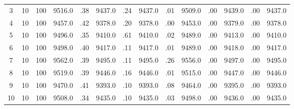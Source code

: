 \documentclass[12pt,a4paper]{article}
\begin{document}
\begin{center}
{\begin{tabular}{|ccc|cc|cc|cc|cc|cc|c|}
3             &  10& 100&   9516.0&  .38&   9437.0&  .24&   9437.0&  .01&   9509.0&  .00&   9439.0&  .00&   9437.0\\[-0.01in]
4             &  10& 100&   9457.0&  .42&   9378.0&  .20&   9378.0&  .00&   9453.0&  .00&   9379.0&  .00&   9378.0\\[-0.01in]
5             &  10& 100&   9496.0&  .35&   9410.0&  .61&   9410.0&  .02&   9489.0&  .00&   9413.0&  .00&   9410.0\\[-0.01in]
6             &  10& 100&   9498.0&  .40&   9417.0&  .11&   9417.0&  .01&   9489.0&  .00&   9418.0&  .00&   9417.0\\[-0.01in]
7             &  10& 100&   9562.0&  .39&   9495.0&  .11&   9495.0&  .26&   9556.0&  .00&   9497.0&  .00&   9495.0\\[-0.01in]
8             &  10& 100&   9519.0&  .39&   9446.0&  .16&   9446.0&  .01&   9515.0&  .00&   9447.0&  .00&   9446.0\\[-0.01in]
9             &  10& 100&   9470.0&  .41&   9393.0&  .10&   9393.0&  .08&   9464.0&  .00&   9395.0&  .00&   9393.0\\[-0.01in]
10            &  10& 100&   9508.0&  .34&   9435.0&  .10&   9435.0&  .03&   9498.0&  .00&   9436.0&  .00&   9435.0\\[-0.01in]
\hline
\end{tabular}
 }
\end{center}
\newpage
\end{document}
